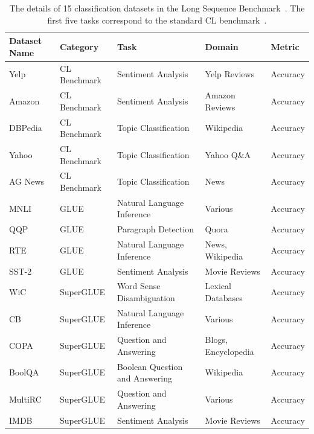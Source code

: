 \begin{table}[!h]
\centering
\begin{tabular}{lllll}
\toprule
\textbf{Dataset Name} & \textbf{Category} & \textbf{Task} & \textbf{Domain} & \textbf{Metric} \\
\midrule
Yelp       & CL Benchmark & Sentiment Analysis               & Yelp Reviews            & Accuracy \\
Amazon     & CL Benchmark & Sentiment Analysis               & Amazon Reviews          & Accuracy \\
DBPedia    & CL Benchmark & Topic Classification             & Wikipedia               & Accuracy \\
Yahoo      & CL Benchmark & Topic Classification             & Yahoo Q\&A              & Accuracy \\
AG News    & CL Benchmark & Topic Classification             & News                    & Accuracy \\
MNLI       & GLUE         & Natural Language Inference       & Various                 & Accuracy \\
QQP        & GLUE         & Paragraph Detection              & Quora                   & Accuracy \\
RTE        & GLUE         & Natural Language Inference       & News, Wikipedia         & Accuracy \\
SST-2      & GLUE         & Sentiment Analysis               & Movie Reviews           & Accuracy \\
WiC        & SuperGLUE    & Word Sense Disambiguation        & Lexical Databases       & Accuracy \\
CB         & SuperGLUE    & Natural Language Inference       & Various                 & Accuracy \\
COPA       & SuperGLUE    & Question and Answering           & Blogs, Encyclopedia     & Accuracy \\
BoolQA     & SuperGLUE    & Boolean Question and Answering   & Wikipedia               & Accuracy \\
MultiRC    & SuperGLUE    & Question and Answering           & Various                 & Accuracy \\
IMDB       & SuperGLUE    & Sentiment Analysis               & Movie Reviews           & Accuracy \\
\bottomrule
\end{tabular}
\caption{
The details of 15 classification datasets in the Long Sequence Benchmark~\cite{razdaibiedina2023progressive}. The first five tasks correspond to the standard CL benchmark~\cite{zhang2015character}.
}
\label{tab:longseq_datasets}
\end{table}


